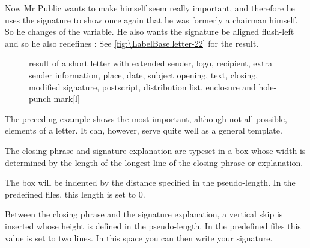 \begin{Example}
  Now Mr Public wants to make himself seem really important, and therefore he uses the
  signature to show once again that he was formerly a chairman himself. So
  he changes  of the
   variable. He also wants the signature
  be aligned flush-left and so he also redefines :%
  See \autoref{fig:\LabelBase.letter-22} for the result.
  \begin{figure}
    \setcapindent{0pt}%
    \begin{captionbeside}
      {result of a short letter with extended sender, logo, recipient,
        extra sender information, place, date, subject opening, text,
        closing, modified signature, postscript, distribution list, enclosure
        and hole-punch mark}[l]
    \end{captionbeside}
    \label{fig:\LabelBase.letter-22}
  \end{figure}
\end{Example}
\iftrue%
  The preceding example shows the most important, although not all possible,
  elements of a letter. It can, however, serve quite well as a general
  template.%
\else
  \vskip -1\ht\strutbox plus .75\ht\strutbox%
\fi
%
\EndIndexGroup


\begin{Declaration}
\end{Declaration}
The closing phrase and signature
explanation are typeset in a box whose width is determined by the length of
the longest line of the closing phrase or explanation.

The box will be indented by the distance specified in the 
pseudo-length. In the predefined  files, this length is set to 0.

Between the closing phrase and the signature explanation, a vertical skip is
inserted whose height is defined in the 
pseudo-length. In the predefined  files this value is set to two lines. In this
space you can then write your signature.%
\iffalse%
\ If you decide to include a facsimile of your signature in the
\DescRef{\LabelBase.variable.signature}\IndexVariable{signature}%
\important{\DescRef{\LabelBase.variable.signature}} with the
\Package{graphicx}\IndexPackage{graphicx} package, it would be useful
to reduce the value of \PLength{sigbeforevskip} and thus the gap between
the closing phrase and the signature.%
\fi%
\EndIndexGroup
%
\EndIndexGroup


